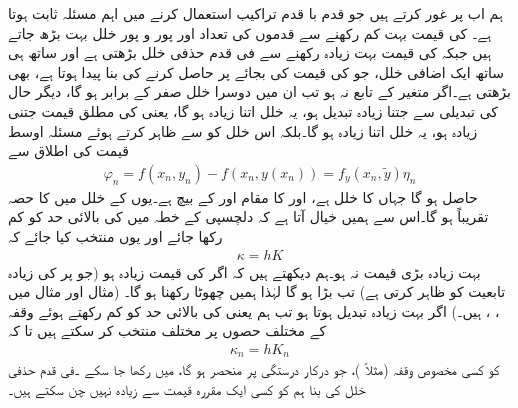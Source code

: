 ہم اب  پر غور کرتے ہیں جو قدم با قدم تراکیب استعمال کرنے میں اہم مسئلہ ثابت ہوتا ہے۔ کی قیمت بہت کم رکھنے سے قدموں کی تعداد اور  پور و پور خلل بہت بڑھ جاتے ہیں جبکہ  کی قیمت بہت زیادہ رکھنے سے  فی قدم حذفی خلل بڑھتی ہے اور ساتھ ہی ساتھ ایک اضافی خلل، جو  کی قیمت  کی بجائے  پر حاصل کرنے کی بنا پیدا ہوتا ہے، بھی بڑھتی  ہے۔اگر  متغیر  کے تابع نہ ہو تب ان میں دوسرا خلل صفر کے برابر ہو گا، دیگر حال  کی تبدیلی سے  جتنا زیادہ تبدیل ہو، یہ خلل اتنا زیادہ ہو گا، یعنی  کی مطلق قیمت جتنی زیادہ ہو، یہ خلل اتنا زیادہ ہو گا۔بلکہ اس خلل کو  سے ظاہر کرتے ہوئے مسئلہ اوسط قیمت کی اطلاق سے 
\begin{align*}
\varphi_n=f(x_n,y_n)-f(x_n,y(x_n))=f_y(x_n,\tilde{y})\eta_n
\end{align*}
حاصل ہو گا جہاں   کا خلل  ہے، اور  کا مقام    اور  کے بیچ ہے۔یوں  کے خلل میں  کا حصہ تقریباً  ہو گا۔اس سے ہمیں خیال آتا ہے کہ دلچسپی کے خطہ میں  کی بالائی حد  کو کم رکھا جائے اور  یوں منتخب کیا جائے کہ
\begin{align*}
\kappa=hK
\end{align*}
بہت زیادہ بڑی قیمت نہ ہو۔ہم دیکھتے ہیں کہ اگر  کی قیمت زیادہ ہو (جو  پر  کی زیادہ تابعیت کو ظاہر کرتی ہے) تب  بڑا ہو گا لہٰذا ہمیں  چھوٹا رکھنا ہو گا۔ (مثال  اور مثال  میں ، ،  ہیں۔) اگر  بہت زیادہ تبدیل ہوتا ہو تب ہم  یعنی  کی بالائی حد کو کم رکھتے ہوئے وقفہ کے مختلف حصوں پر مختلف  منتخب کر سکتے ہیں تا کہ 
\begin{align*}
\kappa_n=hK_n
\end{align*}
کو کسی مخصوص  وقفہ (مثلاً )، جو  درکار درستگی پر منحصر ہو گا،  میں رکھا جا سکے ۔فی قدم حذفی خلل کی بنا ہم  کو کسی ایک مقررہ  قیمت سے زیادہ نہیں چن سکتے ہیں۔

